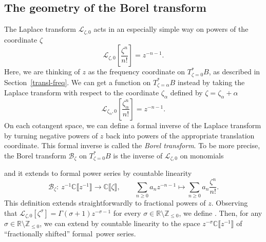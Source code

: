 \documentclass[10pt,a4paper]{amsart}
\newcommand{\maps}{\colon}
\newcommand{\Z}{\mathbb{Z}}
\newcommand{\R}{\mathbb{R}}
\newcommand{\C}{\mathbb{C}}
\newcommand{\laplace}{\mathcal{L}}
\newcommand{\borel}{\mathcal{B}}
\numberwithin{equation}{section}
\begin{document}
\subsection{The geometry of the Borel transform}\label{sec:geometry_borel}
The Laplace transform $\laplace_{\zeta, 0}$ acts in an especially simple way on powers of the coordinate $\zeta$
\[ \laplace_{\zeta, 0}\left[\frac{\zeta^n}{n!}\right] = z^{-n-1}. \]
Here, we are thinking of $z$ as the frequency coordinate on $T^*_{\zeta = 0}B$, as described in Section~\ref{transl-freq}. We can get a function on $T^*_{\zeta = \alpha}B$ instead by taking the Laplace transform with respect to the coordinate $\zeta_\alpha$ defined by $\zeta = \zeta_\alpha + \alpha$
\[ \laplace_{\zeta_\alpha, 0}\left[\frac{\zeta_\alpha^n}{n!}\right] = z^{-n-1}. \]
On each cotangent space, we can define a formal inverse of the Laplace transform by turning negative powers of $z$ back into powers of the appropriate translation coordinate. This formal inverse is called the {\em Borel transform}. To be more precise, the Borel transform $\borel_\zeta$ on $T^*_{\zeta = 0}B$ is the inverse of $\laplace_{\zeta,0}$ on monomials
\begin{center}
\end{center}
and it extends to formal power series by countable linearity
\begin{equation*}
\borel_\zeta \maps\ z^{-1} \C \big\llbracket z^{-1} \big\rrbracket \to \C \llbracket \zeta \rrbracket ,\qquad
\sum_{n \ge 0} a_n z^{-n-1} \mapsto \sum_{n \ge 0} a_n \frac{\zeta^n}{n!}.
\end{equation*}
This definition extends straightforwardly to fractional powers of $z$. Observing that
$\laplace_{\zeta,0}[\zeta^\sigma]=\Gamma(\sigma+1)z^{-\sigma-1}$
for every $\sigma \in \R \setminus \Z_{\leq 0}$, we define
\smash{$
\borel_\zeta\bigl[z^{-\sigma-1}\bigr] := \frac{\zeta^{\sigma}}{\Gamma(\sigma+1)}$}.
Then, for any $\sigma \in \R \setminus \Z_{\leq 0}$, we can extend by countable linearity to the space $z^{-\sigma}\C\big\llbracket z^{-1}\big\rrbracket$ of ``fractionally shifted'' formal~power series.
\end{document}

